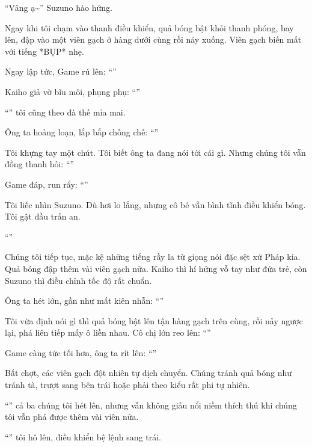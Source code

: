 \documentclass[../main.tex]{subfiles}
\begin{document}
``Vâng ạ\~{}'' Suzuno hào hứng.

Ngay khi tôi chạm vào thanh điều khiển, quả bóng bật khỏi thanh phóng, bay lên, đập vào một viên gạch ở hàng dưới cùng rồi nảy xuống. Viên gạch biến mất với tiếng *BỤP* nhẹ.

Ngay lập tức, Game rú lên: ``''

Kaiho giả vờ bĩu môi, phụng phụ: ``''

``'' tôi cũng theo đà thế mỉa mai.

Ông ta hoảng loạn, lắp bắp chống chế: ``''

Tôi khựng tay một chút. Tôi biết ông ta đang nói tới cái gì. Nhưng chúng tôi vẫn đồng thanh hỏi: ``''

Game đáp, run rẩy: ``''

Tôi liếc nhìn Suzuno. Dù hơi lo lắng, nhưng cô bé vẫn bình tĩnh điều khiển bóng. Tôi gật đầu trấn an.

``''

Chúng tôi tiếp tục, mặc kệ những tiếng rầy la từ giọng nói đặc sệt xứ Pháp kia. Quả bóng đập thêm vài viên gạch nữa. Kaiho thì hí hửng vỗ tay như đứa trẻ, còn Suzuno thì điều chỉnh tốc độ rất chuẩn.

Ông ta hét lớn, gần như mất kiên nhẫn: ``''

Tôi vừa định nói gì thì quả bóng bật lên tận hàng gạch trên cùng, rồi nảy ngược lại, phá liên tiếp mấy ô liền nhau. Cô chị lớn reo lên: ``''

Game càng tức tối hơn, ông ta rít lên: ``''

Bất chợt, các viên gạch đột nhiên tự dịch chuyển. Chúng tránh quả bóng như tránh tà, trượt sang bên trái hoặc phải theo kiểu rất phi tự nhiên.


``'' cả ba chúng tôi hét lên, nhưng vẫn không giấu nổi niềm thích thú khi chúng tôi vẫn phá được thêm vài viên nữa.

``'' tôi hô lên, điều khiển bệ lệnh sang trái.
\end{document}
